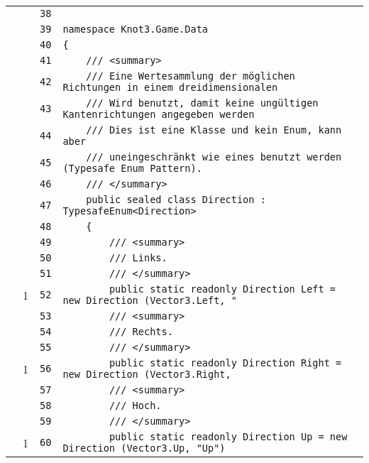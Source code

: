 \documentclass[a4paper,10pt]{article}
\begin{document}
\begin{longtable}[l]{lrrl}
\cellcolor{gray} &  & \verb~38~ & \verb~~\\
\cellcolor{gray} &  & \verb~39~ & \verb~namespace Knot3.Game.Data~\\
\cellcolor{gray} &  & \verb~40~ & \verb~{~\\
\cellcolor{gray} &  & \verb~41~ & \verb~    /// <summary>~\\
\cellcolor{gray} &  & \verb~42~ & \verb~    /// Eine Wertesammlung der möglichen Richtungen in einem dreidimensionalen~\\
\cellcolor{gray} &  & \verb~43~ & \verb~    /// Wird benutzt, damit keine ungültigen Kantenrichtungen angegeben werden~\\
\cellcolor{gray} &  & \verb~44~ & \verb~    /// Dies ist eine Klasse und kein Enum, kann aber~\\
\cellcolor{gray} &  & \verb~45~ & \verb~    /// uneingeschränkt wie eines benutzt werden (Typesafe Enum Pattern).~\\
\cellcolor{gray} &  & \verb~46~ & \verb~    /// </summary>~\\
\cellcolor{gray} &  & \verb~47~ & \verb~    public sealed class Direction : TypesafeEnum<Direction>~\\
\cellcolor{gray} &  & \verb~48~ & \verb~    {~\\
\cellcolor{gray} &  & \verb~49~ & \verb~        /// <summary>~\\
\cellcolor{gray} &  & \verb~50~ & \verb~        /// Links.~\\
\cellcolor{gray} &  & \verb~51~ & \verb~        /// </summary>~\\
\cellcolor{green} & 1 & \verb~52~ & \verb~        public static readonly Direction Left = new Direction (Vector3.Left, "~\\
\cellcolor{gray} &  & \verb~53~ & \verb~        /// <summary>~\\
\cellcolor{gray} &  & \verb~54~ & \verb~        /// Rechts.~\\
\cellcolor{gray} &  & \verb~55~ & \verb~        /// </summary>~\\
\cellcolor{green} & 1 & \verb~56~ & \verb~        public static readonly Direction Right = new Direction (Vector3.Right,~\\
\cellcolor{gray} &  & \verb~57~ & \verb~        /// <summary>~\\
\cellcolor{gray} &  & \verb~58~ & \verb~        /// Hoch.~\\
\cellcolor{gray} &  & \verb~59~ & \verb~        /// </summary>~\\
\cellcolor{green} & 1 & \verb~60~ & \verb~        public static readonly Direction Up = new Direction (Vector3.Up, "Up")~\\

\end{longtable}
\end{document}
